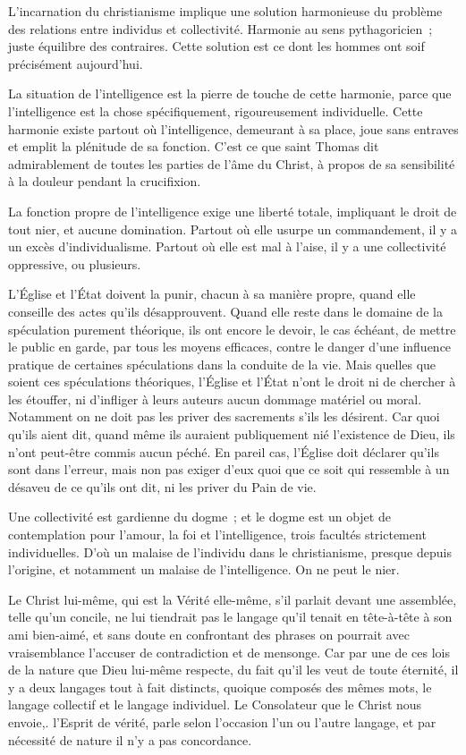 \documentclass[french,twoside]{book} %
\begin{document}
L'incarnation du christianisme implique une solution harmonieuse du problème des relations entre individus et collectivité. Harmonie au sens pythagoricien ; juste équilibre des contraires. Cette solution est ce dont les hommes ont soif précisément aujourd'hui.\par
La situation de l'intelligence est la pierre de touche de cette harmonie, parce que l'intelligence est la chose spécifiquement, rigoureusement individuelle. Cette harmonie existe partout où l'intelligence, demeurant à sa place, joue sans entraves et emplit la plénitude de sa fonction. C'est ce que saint Thomas dit admirablement de toutes les parties de l'âme du Christ, à propos de sa sensibilité à la douleur pendant la crucifixion.\par
La fonction propre de l'intelligence exige une liberté totale, impliquant le droit de tout nier, et aucune domination. Partout où elle usurpe un commandement, il y a un excès d'individualisme. Partout où elle est mal à l'aise, il y a une collectivité oppressive, ou plusieurs.\par
L'Église et l'État doivent la punir, chacun à sa manière propre, quand elle conseille des actes qu'ils désapprouvent. Quand elle reste dans le domaine de la spéculation purement théorique, ils ont encore le devoir, le cas échéant, de mettre le public en garde, par tous les moyens efficaces, contre le danger d'une influence pratique de certaines spéculations dans la conduite de la vie. Mais quelles que soient ces spéculations théoriques, l'Église et l'État n'ont le droit ni de chercher à les étouffer, ni d'infliger à leurs auteurs aucun dommage matériel ou moral. Notamment on ne doit pas les priver des sacrements s'ils les désirent. Car quoi qu'ils aient dit, quand même ils auraient publiquement nié l'existence de Dieu, ils n'ont peut-être commis aucun péché. En pareil cas, l'Église doit déclarer qu'ils sont dans l'erreur, mais non pas exiger d'eux quoi que ce soit qui ressemble à un désaveu de ce qu'ils ont dit, ni les priver du Pain de vie.\par
Une collectivité est gardienne du dogme ; et le dogme est un objet de contemplation pour l'amour, la foi et l'intelligence, trois facultés strictement individuelles. D'où un malaise de l'individu dans le christianisme, presque depuis l'origine, et notamment un malaise de l'intelligence. On ne peut le nier.\par
Le Christ lui-même, qui est la Vérité elle-même, s'il parlait devant une assemblée, telle qu'un concile, ne lui tiendrait pas le langage qu'il tenait en tête-à-tête à son ami bien-aimé, et sans doute en confrontant des phrases on pourrait avec vraisemblance l'accuser de contradiction et de mensonge. Car par une de ces lois de la nature que Dieu lui-même respecte, du fait qu'il les veut de toute éternité, il y a deux langages tout à fait distincts, quoique composés des mêmes mots, le langage collectif et le langage individuel. Le Consolateur que le Christ nous envoie,. l'Esprit de vérité, parle selon l'occasion l'un ou l'autre langage, et par nécessité de nature il n'y a pas concordance.\par
\end{document}
